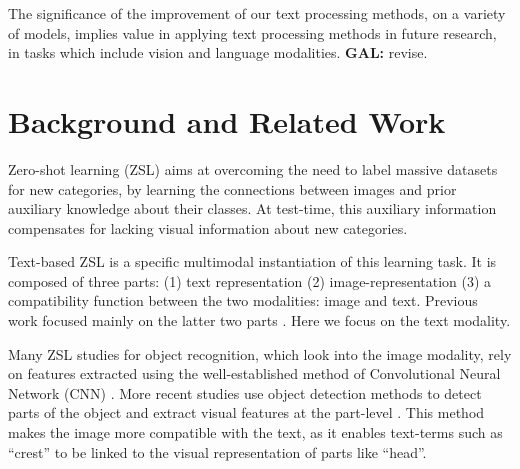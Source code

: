 \documentclass[11pt,a4paper]{article}
\newcommand\gal[1]{\textcolor{bright}{\textbf{GAL:} #1 }}
\begin{document}

The significance of the improvement of our text processing methods, on a variety of models, implies value in applying text processing methods in future research, in tasks which include vision and language modalities. \gal{revise.}


\section{Background and Related Work}


Zero-shot learning (ZSL) aims at overcoming the need to label massive datasets for new categories, by learning the connections between images and prior auxiliary knowledge about their classes. At  test-time, this auxiliary information compensates for lacking visual information about new categories.
\par

Text-based ZSL is a specific multimodal instantiation of this learning task. It is composed of three parts: (1) text representation (2) image-representation (3) a compatibility function between the two modalities: image and text.   Previous work focused mainly on the latter two parts \cite{zhu2018generative, akata2015evaluation}. Here we focus on the text modality.  

Many ZSL  studies \cite{xu2018attngan,lei2015predicting,qiao2016less,akata2016multi}  for object recognition, which look into the image modality, rely on features  extracted using the well-established method of
Convolutional Neural Network (CNN) \cite{lecun1995convolutional}. More recent studies use object detection methods to detect parts of the object and extract visual features at the part-level \cite{elhoseiny2017link,zhu2018generative,zhang2016spda}. This
method makes the image more compatible with the text, as it enables text-terms such as \enquote{crest} to be linked to the visual representation of parts like \enquote{head}. 
\end{document}
